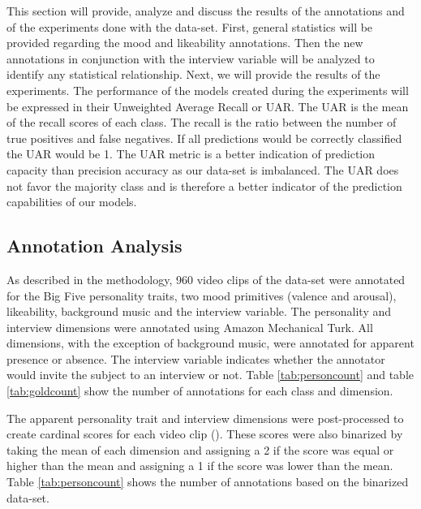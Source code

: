 This section will provide, analyze and discuss the results of the annotations and of the experiments done with the data-set. First, general statistics will be provided regarding the mood and likeability annotations. Then the new annotations in conjunction with the interview variable will be analyzed to identify any statistical relationship. Next, we will provide the results of the experiments. The performance of the models created during the experiments will be expressed in their Unweighted Average Recall or UAR. The UAR is the mean of the recall scores of each class. The recall is the ratio between the number of true positives and false negatives. If all predictions would be correctly classified the UAR would be 1. The UAR metric  is a better indication of prediction capacity than precision accuracy as our data-set is imbalanced. The UAR does not favor the majority class and is therefore a better indicator of the prediction capabilities of our models.
\break

\subsection{Annotation Analysis}
As described in the methodology, 960 video clips of the data-set were annotated for the Big Five personality traits, two mood primitives (valence and arousal), likeability, background music and the interview variable. The personality and interview dimensions were annotated using Amazon Mechanical Turk. All dimensions, with the exception of background music, were annotated for apparent presence or absence. The interview variable indicates whether the annotator would invite the subject to an interview or not. Table \ref{tab:personcount} and table \ref{tab:goldcount} show the number of annotations for each class and dimension. 

The apparent personality trait and interview dimensions were post-processed to create cardinal scores for each video clip (\cite{escalante2018explaining}). These scores were also binarized by taking the mean of each dimension and assigning a 2 if the score was equal or higher than the mean and assigning a 1 if the score was lower than the mean. Table \ref{tab:personcount} shows the number of annotations based on the binarized data-set. 

